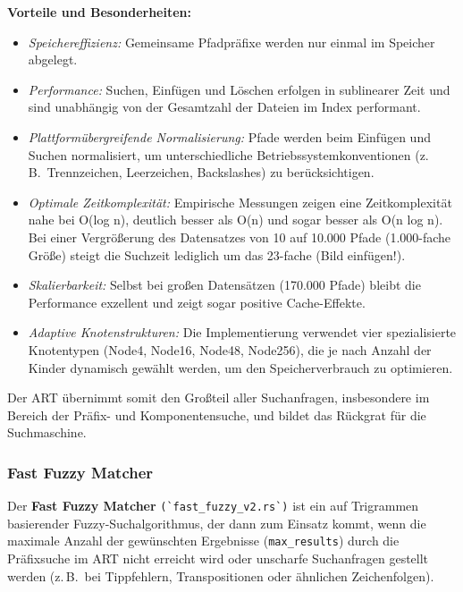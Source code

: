 \textbf{Vorteile und Besonderheiten:}
\begin{itemize}
	\item \textit{Speichereffizienz:} Gemeinsame Pfadpräfixe werden nur einmal im Speicher abgelegt.
	\item \textit{Performance:} Suchen, Einfügen und Löschen erfolgen in sublinearer Zeit und sind unabhängig von der Gesamtzahl der Dateien im Index performant.
	\item \textit{Plattformübergreifende Normalisierung:} Pfade werden beim Einfügen und Suchen normalisiert, um unterschiedliche Betriebssystemkonventionen (z.\,B.\ Trennzeichen, Leerzeichen, Backslashes) zu berücksichtigen.
	\item \textit{Optimale Zeitkomplexität:} Empirische Messungen zeigen eine Zeitkomplexität nahe bei O(log n), deutlich besser als O(n) und sogar besser als O(n log n). Bei einer Vergrößerung des Datensatzes von 10 auf 10.000 Pfade (1.000-fache Größe) steigt die Suchzeit lediglich um das 23-fache (Bild einfügen!).
	\item \textit{Skalierbarkeit:} Selbst bei großen Datensätzen (170.000 Pfade) bleibt die Performance exzellent und zeigt sogar positive Cache-Effekte.
	\item \textit{Adaptive Knotenstrukturen:} Die Implementierung verwendet vier spezialisierte Knotentypen (Node4, Node16, Node48, Node256), die je nach Anzahl der Kinder dynamisch gewählt werden, um den Speicherverbrauch zu optimieren.
\end{itemize}

Der ART übernimmt somit den Großteil aller Suchanfragen, insbesondere im Bereich der Präfix- und Komponentensuche, und bildet das Rückgrat für die Suchmaschine.

\subsubsection{Fast Fuzzy Matcher}
Der \textbf{Fast Fuzzy Matcher} \verb|(`fast_fuzzy_v2.rs`)| ist ein auf Trigrammen basierender Fuzzy-Suchalgorithmus, der dann zum Einsatz kommt, wenn die maximale Anzahl der gewünschten Ergebnisse (\texttt{max\_results}) durch die Präfixsuche im ART nicht erreicht wird oder unscharfe Suchanfragen gestellt werden (z.\,B.\ bei Tippfehlern, Transpositionen oder ähnlichen Zeichenfolgen).

